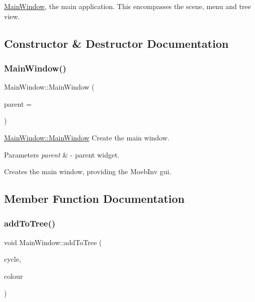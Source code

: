 \mbox{\hyperlink{class_main_window}{Main\+Window}}, the main application. This encompasses the scene, menu and tree view. 

\subsection{Constructor \& Destructor Documentation}
\mbox{\label{class_main_window_a8b244be8b7b7db1b08de2a2acb9409db}} 
\subsubsection{\texorpdfstring{Main\+Window()}{MainWindow()}}
{\footnotesize\ttfamily Main\+Window\+::\+Main\+Window (\begin{DoxyParamCaption}\item[{Q\+Widget $\ast$}]{parent = {} }\end{DoxyParamCaption})\hspace{0.3cm}{\ttfamily [explicit]}}



\mbox{\hyperlink{class_main_window_a8b244be8b7b7db1b08de2a2acb9409db}{Main\+Window\+::\+Main\+Window}} Create the main window. 


\begin{DoxyParams}{Parameters}
{\em parent} & -\/ parent widget.\\
\hline
\end{DoxyParams}
Creates the main window, providing the Moeb\+Inv gui. 

\subsection{Member Function Documentation}
\mbox{\label{class_main_window_a816f983db7e31a8a3e8376538b44804f}} 
\subsubsection{\texorpdfstring{add\+To\+Tree()}{addToTree()}}
{\footnotesize\ttfamily void Main\+Window\+::add\+To\+Tree (\begin{DoxyParamCaption}\item[{const Gi\+Na\+C\+::ex \&}]{cycle,  }\item[{const Q\+Color \&}]{colour }\end{DoxyParamCaption})}



